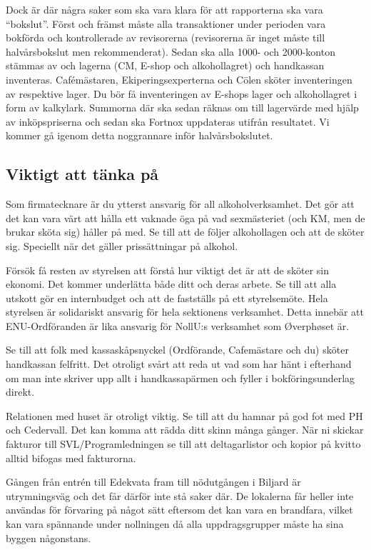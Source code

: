 \documentclass[10pt]{article}
\begin{document}
Dock är där några saker som ska vara klara för att rapporterna ska vara “bokslut”. Först och främst måste alla transaktioner under perioden vara bokförda och kontrollerade av revisorerna (revisorerna är inget måste till halvårsbokslut men rekommenderat). Sedan ska alla 1000- och 2000-konton stämmas av och lagerna (CM, E-shop och alkohollagret) och handkassan inventeras. Cafémästaren, Ekiperingsexperterna och Cölen sköter inventeringen av respektive lager. Du bör få inventeringen av E-shops lager och alkohollagret i form av kalkylark. Summorna där ska sedan räknas om till lagervärde med hjälp av inköpspriserna och sedan ska Fortnox uppdateras utifrån resultatet. Vi kommer gå igenom detta noggrannare inför halvårsbokslutet.

\subsection{Viktigt att tänka på}
Som firmatecknare är du ytterst ansvarig för all alkoholverksamhet. Det gör att det kan vara värt att hålla ett vaknade öga på vad sexmästeriet (och KM, men de brukar sköta sig) håller på med. Se till att de följer alkohollagen och att de sköter sig. Speciellt när det gäller prissättningar på alkohol.

Försök få resten av styrelsen att förstå hur viktigt det är att de sköter sin ekonomi. Det kommer underlätta både ditt och deras arbete. Se till att alla utskott gör en internbudget och
att de fastställs på ett styrelsemöte. Hela styrelsen är solidariskt ansvarig för hela sektionens verksamhet. Detta innebär att ENU-Ordföranden är lika ansvarig för NollU:s verksamhet som Øverphøset är.

Se till att folk med kassaskåpsnyckel (Ordförande, Cafemästare och du) sköter handkassan felfritt. Det otroligt svårt att reda ut vad som har hänt i efterhand om man inte skriver upp allt i handkassapärmen och fyller i bokföringsunderlag direkt.

Relationen med huset är otroligt viktig. Se till att du hamnar på god fot med PH och Cedervall. Det kan komma att rädda ditt skinn många gånger.
När ni skickar fakturor till SVL/Programledningen se till att deltagarlistor och kopior på kvitto alltid bifogas med fakturorna.

Gången från entrén till Edekvata fram till nödutgången i Biljard är utrymningsväg och det får därför inte stå saker där. De lokalerna får heller inte användas för förvaring på något sätt eftersom det kan vara en brandfara, vilket kan vara spännande under nollningen då alla uppdragsgrupper måste ha sina byggen någonstans.
\end{document}

